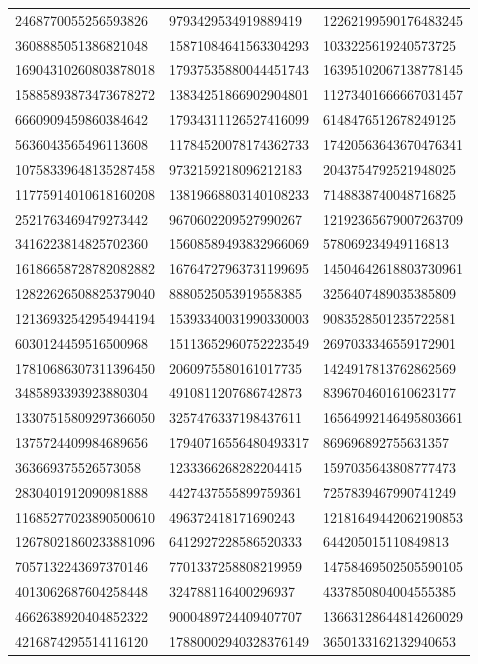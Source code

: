\begin{longtable}{*{3}{l}}
2468770055256593826&9793429534919889419&12262199590176483245\\
3608885051386821048&15871084641563304293&1033225619240573725\\
16904310260803878018&17937535880044451743&16395102067138778145\\
15885893873473678272&13834251866902904801&11273401666667031457\\
6660909459860384642&17934311126527416099&6148476512678249125\\
5636043565496113608&11784520078174362733&17420563643670476341\\
10758339648135287458&9732159218096212183&2043754792521948025\\
11775914010618160208&13819668803140108233&7148838740048716825\\
2521763469479273442&9670602209527990267&12192365679007263709\\
3416223814825702360&15608589493832966069&578069234949116813\\
16186658728782082882&16764727963731199695&14504642618803730961\\
12822626508825379040&8880525053919558385&3256407489035385809\\
12136932542954944194&15393340031990330003&9083528501235722581\\
6030124459516500968&15113652960752223549&2697033346559172901\\
17810686307311396450&2060975580161017735&1424917813762862569\\
3485893393923880304&4910811207686742873&8396704601610623177\\
13307515809297366050&3257476337198437611&16564992146495803661\\
1375724409984689656&17940716556480493317&869696892755631357\\
363669375526573058&1233366268282204415&1597035643808777473\\
2830401912090981888&4427437555899759361&7257839467990741249\\
11685277023890500610&496372418171690243&12181649442062190853\\
12678021860233881096&6412927228586520333&644205015110849813\\
7057132243697370146&7701337258808219959&14758469502505590105\\
4013062687604258448&324788116400296937&4337850804004555385\\
4662638920404852322&9000489724409407707&13663128644814260029\\
4216874295514116120&17880002940328376149&3650133162132940653\\

\end{longtable}
